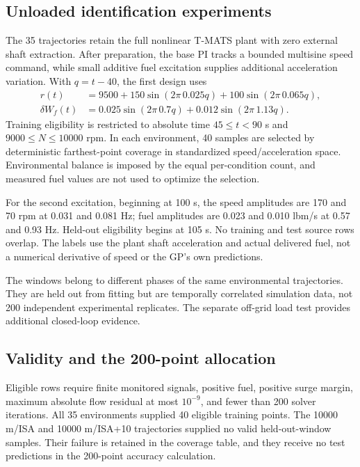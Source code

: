 \subsection{Unloaded identification experiments}
The 35 trajectories retain the full nonlinear T-MATS plant with zero external shaft extraction. After preparation, the base PI tracks a bounded multisine speed command, while small additive fuel excitation supplies additional acceleration variation. With $q=t-40$, the first design uses
\begin{align}
r(t)&=9500+150\sin(2\pi\,0.025q)+100\sin(2\pi\,0.065q),\\
\delta W_f(t)&=0.025\sin(2\pi\,0.7q)+0.012\sin(2\pi\,1.13q).
\end{align}
Training eligibility is restricted to absolute time $45\leq t<90$ s and $9000\leq N\leq10000$ rpm. In each environment, 40 samples are selected by deterministic farthest-point coverage in standardized speed/acceleration space. Environmental balance is imposed by the equal per-condition count, and measured fuel values are not used to optimize the selection.

For the second excitation, beginning at 100 s, the speed amplitudes are 170 and 70 rpm at 0.031 and 0.081 Hz; fuel amplitudes are 0.023 and 0.010 lbm/s at 0.57 and 0.93 Hz. Held-out eligibility begins at 105 s. No training and test source rows overlap. The labels use the plant shaft acceleration and actual delivered fuel, not a numerical derivative of speed or the GP's own predictions.

The windows belong to different phases of the same environmental trajectories. They are held out from fitting but are temporally correlated simulation data, not 200 independent experimental replicates. The separate off-grid load test provides additional closed-loop evidence.

\subsection{Validity and the 200-point allocation}
Eligible rows require finite monitored signals, positive fuel, positive surge margin, maximum absolute flow residual at most $10^{-9}$, and fewer than 200 solver iterations. All 35 environments supplied 40 eligible training points. The 10000 m/ISA and 10000 m/ISA+10 trajectories supplied no valid held-out-window samples. Their failure is retained in the coverage table, and they receive no test predictions in the 200-point accuracy calculation.

